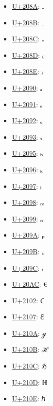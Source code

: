 \begin{itemize}
	\item \href{https://www.compart.com/en/unicode/U+208A}{U+208A}: ₊
	\item \href{https://www.compart.com/en/unicode/U+208B}{U+208B}: ₋
	\item \href{https://www.compart.com/en/unicode/U+208C}{U+208C}: ₌
	\item \href{https://www.compart.com/en/unicode/U+208D}{U+208D}: ₍
	\item \href{https://www.compart.com/en/unicode/U+208E}{U+208E}: ₎
	\item \href{https://www.compart.com/en/unicode/U+2090}{U+2090}: ₐ
	\item \href{https://www.compart.com/en/unicode/U+2091}{U+2091}: ₑ
	\item \href{https://www.compart.com/en/unicode/U+2092}{U+2092}: ₒ
	\item \href{https://www.compart.com/en/unicode/U+2093}{U+2093}: ₓ
	\item \href{https://www.compart.com/en/unicode/U+2095}{U+2095}: ₕ
	\item \href{https://www.compart.com/en/unicode/U+2096}{U+2096}: ₖ
	\item \href{https://www.compart.com/en/unicode/U+2097}{U+2097}: ₗ
	\item \href{https://www.compart.com/en/unicode/U+2098}{U+2098}: ₘ
	\item \href{https://www.compart.com/en/unicode/U+2099}{U+2099}: ₙ
	\item \href{https://www.compart.com/en/unicode/U+209A}{U+209A}: ₚ
	\item \href{https://www.compart.com/en/unicode/U+209B}{U+209B}: ₛ
	\item \href{https://www.compart.com/en/unicode/U+209C}{U+209C}: ₜ
	\item \href{https://www.compart.com/en/unicode/U+20AC}{U+20AC}: €
	\item \href{https://www.compart.com/en/unicode/U+2102}{U+2102}: ℂ
	\item \href{https://www.compart.com/en/unicode/U+2107}{U+2107}: ℇ
	\item \href{https://www.compart.com/en/unicode/U+210A}{U+210A}: ℊ
	\item \href{https://www.compart.com/en/unicode/U+210B}{U+210B}: ℋ
	\item \href{https://www.compart.com/en/unicode/U+210C}{U+210C}: ℌ
	\item \href{https://www.compart.com/en/unicode/U+210D}{U+210D}: ℍ
	\item \href{https://www.compart.com/en/unicode/U+210E}{U+210E}: ℎ

\end{itemize}
